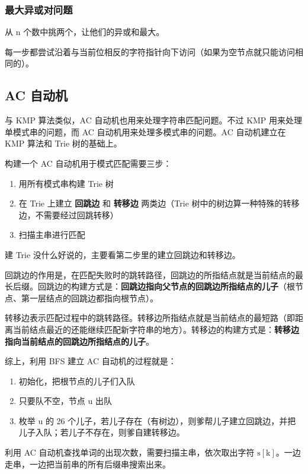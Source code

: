 \documentclass[UTF8]{article}
\begin{document}
\subsubsection{最大异或对问题}
从 $\mathrm{n}$ 个数中挑两个，让他们的异或和最大。

每一步都尝试沿着与当前位相反的字符指针向下访问（如果为空节点就只能访问相同的）。



\subsection{AC 自动机}
与 KMP 算法类似，AC 自动机也用来处理字符串匹配问题。不过 KMP 用来处理单模式串的问题，而 AC 自动机用来处理多模式串的问题。AC 自动机建立在 KMP 算法和 Trie 树的基础上。

构建一个 AC 自动机用于模式匹配需要三步：

\begin{enumerate}
	\item 用所有模式串构建 Trie 树
	\item 在 Trie 上建立 \textbf{回跳边} 和 \textbf{转移边} 两类边（Trie 树中的树边算一种特殊的转移边，不需要经过回跳转移）
	\item 扫描主串进行匹配
\end{enumerate}

建 Trie 没什么好说的，主要看第二步里的建立回跳边和转移边。

回跳边的作用是，在匹配失败时的跳转路径，回跳边的所指结点就是当前结点的最长后缀。回跳边的构建方式是：\textbf{回跳边指向父节点的回跳边所指结点的儿子}（根节点、第一层结点的回跳边都指向根节点）。

转移边表示匹配过程中的跳转路径。转移边所指结点就是当前结点的最短路（即距离当前结点最近的还能继续匹配新字符串的地方）。转移边的构建方式是：\textbf{转移边指向当前结点的回跳边所指结点的儿子}。

综上，利用 BFS 建立 AC 自动机的过程就是：

\begin{enumerate}
	\item 初始化，把根节点的儿子们入队
	\item 只要队不空，节点 u 出队
	\item 枚举 u 的 26 个儿子，若儿子存在（有树边），则爹帮儿子建立回跳边，并把儿子入队；若儿子不存在，则爹自建转移边。
\end{enumerate}

利用 AC 自动机查找单词的出现次数，需要扫描主串，依次取出字符 $\mathrm{s[k]}$。一边走串，一边把当前串的所有后缀串搜索出来。
\end{document}
